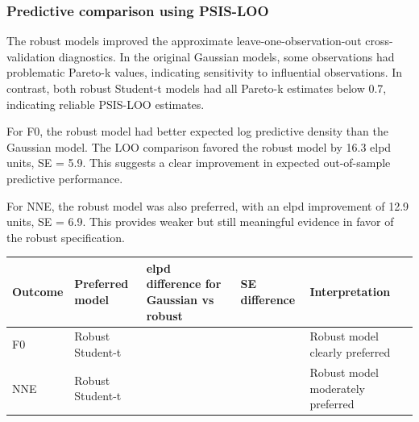 \documentclass[
  english,
  man,floatsintext]{apa6}
\newcounter{none} %
\begin{document}
\subsubsection{Predictive comparison using PSIS-LOO}\label{predictive-comparison-using-psis-loo}

The robust models improved the approximate leave-one-observation-out cross-validation diagnostics. In the original Gaussian models, some observations had problematic Pareto-k values, indicating sensitivity to influential observations. In contrast, both robust Student-t models had all Pareto-k estimates below 0.7, indicating reliable PSIS-LOO estimates.

For F0, the robust model had better expected log predictive density than the Gaussian model. The LOO comparison favored the robust model by 16.3 elpd units, SE = 5.9. This suggests a clear improvement in expected out-of-sample predictive performance.

For NNE, the robust model was also preferred, with an elpd improvement of 12.9 units, SE = 6.9. This provides weaker but still meaningful evidence in favor of the robust specification.

{\def\LTcaptype{none} %
\begin{longtable}[]{@{}
  >{\raggedright\arraybackslash}p{}
  >{\raggedright\arraybackslash}p{}
  >{\raggedleft\arraybackslash}p{}
  >{\raggedleft\arraybackslash}p{}
  >{\raggedright\arraybackslash}p{}@{}}
\toprule\noalign{}
\begin{minipage}[b]{\linewidth}\raggedright
Outcome
\end{minipage} & \begin{minipage}[b]{\linewidth}\raggedright
Preferred model
\end{minipage} & \begin{minipage}[b]{\linewidth}\raggedleft
elpd difference for Gaussian vs robust
\end{minipage} & \begin{minipage}[b]{\linewidth}\raggedleft
SE difference
\end{minipage} & \begin{minipage}[b]{\linewidth}\raggedright
Interpretation
\end{minipage} \\
\midrule\noalign{}
\endhead
\bottomrule\noalign{}
\endlastfoot
F0 & Robust Student-t & -16.3 & 5.9 & Robust model clearly preferred \\
NNE & Robust Student-t & -12.9 & 6.9 & Robust model moderately preferred \\
\end{longtable}
}
\end{document}
